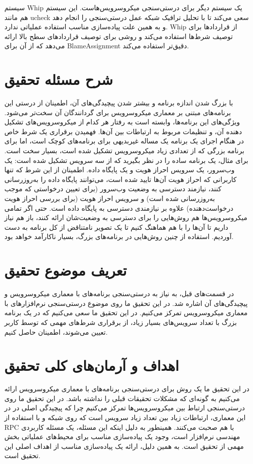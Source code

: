 سیستم
Whip \cite{waye2017whip}
یک سیستم دیگر برای درستی‌سنجی میکروسرویس‌هاست. این سیستم هم مانند ucheck سعی می‌کند تا با تحلیل ترافیک شبکه عمل درستی‌سنجی را انجام دهد و به همین علت پیاده‌سازی مناسب استفاده عملیاتی ندارد. Whip از قراردادها برای توصیف شرط‌ها استفاده می‌کند و روشی برای توصیف قراردادهای سطح‌ بالا ارائه می‌دهد که از آن برای
\gls{BlameAssignment}
دقیق‌تر استفاده می‌کند.

\section{شرح مسئله تحقیق}
با بزرگ شدن اندازه برنامه و بیشتر شدن پیچیدگی‌های آن، اطمینان از درستی این برنامه‌های مبتنی بر معماری میکروسرویس برای گردانندگان آن سخت‌تر می‌شود. ویژگی‌های این برنامه‌ها، وابسته است به رفتار هر کدام از میکروسرویس‌های تشکیل دهنده آن، و تنظیمات مربوط به ارتباطات بین آن‌ها. فهمیدن برقراری یک شرط خاص در هنگام اجرای یک برنامه یک مساله غیربدیهی برای برنامه‌های کوچک است، اما برای برنامه بزرگی که از تعدادی زیاد میکروسرویس تشکیل شده است، بسیار سخت است. برای مثال، یک برنامه ساده را در نظر بگیرید که از سه سرویس تشکیل شده است: یک وب‌سرور، یک سرویس احراز هویت و یک پایگاه داده. اطمینان از این شرط که تنها کاربرانی که احراز هویت آن‌ها تایید شده است، می‌توانند پایگاه داده را به‌روزرسانی کنند، نیازمند دسترسی به وضعیت وب‌سرور (برای تعیین درخواستی که موجب به‌روزرسانی شده است) و سرویس احراز هویت (برای بررسی احراز هویت درخواست‌دهنده)‌ علاوه بر نیازمندی دسترسی به پایگاه داده است. حتی اگر تمامی میکروسرویس‌ها هم روش‌هایی را برای دسترسی به وضعیت‌شان ارائه کنند، باز هم نیاز داریم تا آن‌ها را با هم هماهنگ کنیم تا یک تصویر نامتناقض از کل برنامه به دست آوردیم. استفاده از چنین روش‌هایی در برنامه‌های بزرگ، بسیار ناکارآمد خواهد بود.

\section{تعریف موضوع تحقیق}
در قسمت‌های قبل، به نیاز به درستی‌سنجی برنامه‌های با معماری میکروسرویس و پیچیدگی‌های آن اشاره شد. در این تحقیق ما روی موضوع درستی‌سنجی نرم‌افزارهای با معماری میکروسرویس تمرکز می‌کنیم. در این تحقیق ما سعی می‌کنیم که در یک برنامه‌ بزرگ با تعداد سرویس‌های بسیار زیاد، از برقراری شرط‌های مهمی که توسط کاربر تعیین می‌شوند، اطمینان حاصل کنیم.

\section{اهداف و آرمان‌های کلی تحقیق}
در این تحقیق ما یک روش برای درستی‌سنجی برنامه‌های با معماری میکروسرویس ارائه می‌کنیم به گونه‌ای که مشکلات تحقیقات قبلی را نداشته باشد. در این تحقیق ما روی درستی‌سنجی ارتباط بین میکروسرویس‌ها تمرکز می‌کنیم چرا که پیچیدگی اصلی در در این معماری، ارتباطات زیاد بین تعداد زیاد سرویس است که روی شبکه و با استفاده از
\gls{RPC}
با هم صحبت می‌کنند. همینطور به دلیل اینکه این مسئله، یک مسئله کاربردی مهندسی نرم‌افزار است، وجود یک پیاده‌سازی مناسب برای محیط‌های عملیاتی بخش مهمی از تحقیق است. به همین دلیل،‌ ارائه یک پیاده‌سازی مناسب از اهداف اصلی این تحقیق است.

